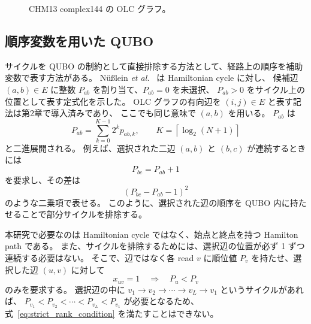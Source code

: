 \documentclass[a4j,10pt]{ujarticle}
\begin{document}
\begin{figure}[htbp]
\centering
{}
\caption{CHM13 complex144 の OLC グラフ。}
\label{fig:complex144_topology_placeholder}
\end{figure}

\subsection{順序変数を用いた QUBO}

サイクルを QUBO の制約として直接排除する方法として、経路上の順序を補助変数で表す方法がある。
N{\"u}{\ss}lein \textit{et al.}\ \cite{nusslein2022qubo} は Hamiltonian cycle に対し、
候補辺 $(a,b)\in E$ に整数 $P_{ab}$ を割り当て、$P_{ab}=0$ を未選択、
$P_{ab}>0$ をサイクル上の位置として表す定式化を示した。
OLC グラフの有向辺を $(i,j)\in E$ と表す記法は第2章で導入済みであり、
ここでも同じ意味で $(a,b)$ を用いる。
$P_{ab}$ は
\begin{equation}
P_{ab}
=
\sum_{k=0}^{K-1}2^k p_{ab,k},
\qquad
K=\left\lceil\log_2(N+1)\right\rceil
\label{eq:nusslein_binary_order}
\end{equation}
と二進展開される。
例えば、選択された二辺 $(a,b)$ と $(b,c)$ が連続するときには
\begin{equation}
P_{bc}=P_{ab}+1
\label{eq:nusslein_successive_order}
\end{equation}
を要求し、その差は
\begin{equation}
\left(P_{bc}-P_{ab}-1\right)^2
\label{eq:nusslein_successive_square}
\end{equation}
のような二乗項で表せる。
このように、選択された辺の順序を QUBO 内に持たせることで部分サイクルを排除する。

本研究で必要なのは Hamiltonian cycle ではなく、始点と終点を持つ Hamilton path である。
また、サイクルを排除するためには、選択辺の位置が必ず 1 ずつ連続する必要はない。
そこで、辺ではなく各 read $v$ に順位値 $P_v$ を持たせ、選択した辺 $(u,v)$ に対して
\begin{equation}
x_{uv}=1
\quad\Longrightarrow\quad
P_u<P_v
\label{eq:strict_rank_condition}
\end{equation}
のみを要求する。
選択辺の中に
$v_1\rightarrow v_2\rightarrow\cdots\rightarrow v_L\rightarrow v_1$
というサイクルがあれば、
$P_{v_1}<P_{v_2}<\cdots<P_{v_L}<P_{v_1}$ が必要となるため、
式~\eqref{eq:strict_rank_condition} を満たすことはできない。
\end{document}
